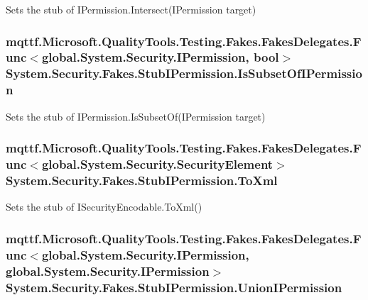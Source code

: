 Sets the stub of I\-Permission.\-Intersect(\-I\-Permission target)

\hypertarget{class_system_1_1_security_1_1_fakes_1_1_stub_i_permission_a7ab0db421eaa56b1f2613289b629c534}{
\subsubsection[{Is\-Subset\-Of\-I\-Permission}]{\setlength{\rightskip}{0pt plus 5cm}mqttf.\-Microsoft.\-Quality\-Tools.\-Testing.\-Fakes.\-Fakes\-Delegates.\-Func$<$global.\-System.\-Security.\-I\-Permission, bool$>$ System.\-Security.\-Fakes.\-Stub\-I\-Permission.\-Is\-Subset\-Of\-I\-Permission}}\label{class_system_1_1_security_1_1_fakes_1_1_stub_i_permission_a7ab0db421eaa56b1f2613289b629c534}


Sets the stub of I\-Permission.\-Is\-Subset\-Of(\-I\-Permission target)

\hypertarget{class_system_1_1_security_1_1_fakes_1_1_stub_i_permission_a9b96e9d5486d129ca21242f50beadb0b}{
\subsubsection[{To\-Xml}]{\setlength{\rightskip}{0pt plus 5cm}mqttf.\-Microsoft.\-Quality\-Tools.\-Testing.\-Fakes.\-Fakes\-Delegates.\-Func$<$global.\-System.\-Security.\-Security\-Element$>$ System.\-Security.\-Fakes.\-Stub\-I\-Permission.\-To\-Xml}}\label{class_system_1_1_security_1_1_fakes_1_1_stub_i_permission_a9b96e9d5486d129ca21242f50beadb0b}


Sets the stub of I\-Security\-Encodable.\-To\-Xml()

\hypertarget{class_system_1_1_security_1_1_fakes_1_1_stub_i_permission_a643c6bc7d2f7bf5f497b780155d1f951}{
\subsubsection[{Union\-I\-Permission}]{\setlength{\rightskip}{0pt plus 5cm}mqttf.\-Microsoft.\-Quality\-Tools.\-Testing.\-Fakes.\-Fakes\-Delegates.\-Func$<$global.\-System.\-Security.\-I\-Permission, global.\-System.\-Security.\-I\-Permission$>$ System.\-Security.\-Fakes.\-Stub\-I\-Permission.\-Union\-I\-Permission}}\label{class_system_1_1_security_1_1_fakes_1_1_stub_i_permission_a643c6bc7d2f7bf5f497b780155d1f951}


